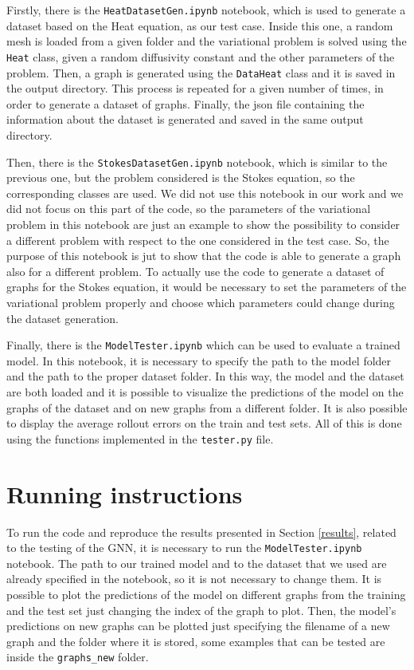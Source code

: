 \documentclass[11pt,a4paper]{article}
\begin{document}
Firstly, there is the \texttt{HeatDatasetGen.ipynb} notebook, which is used to generate a dataset based on the Heat equation, as our test case. Inside this one, a random mesh is loaded from a given folder and the variational problem is solved using the \texttt{Heat} class, given a random diffusivity constant and the other parameters of the problem. Then, a graph is generated using the \texttt{DataHeat} class and it is saved in the output directory. This process is repeated for a given number of times, in order to generate a dataset of graphs. Finally, the json file containing the information about the dataset is generated and saved in the same output directory. 

Then, there is the \texttt{StokesDatasetGen.ipynb} notebook, which is similar to the previous one, but the problem considered is the Stokes equation, so the corresponding classes are used. We did not use this notebook in our work and we did not focus on this part of the code, so the parameters of the variational problem in this notebook are just an example to show the possibility to consider a different problem with respect to the one considered in the test case. So, the purpose of this notebook is jut to show that the code is able to generate a graph also for a different problem. To actually use the code to generate a dataset of graphs for the Stokes equation, it would be necessary to set the parameters of the variational problem properly and choose which parameters could change during the dataset generation.

Finally, there is the \texttt{ModelTester.ipynb} which can be used to evaluate a trained model. In this notebook, it is necessary to specify the path to the model folder and the path to the proper dataset folder. In this way, the model and the dataset are both loaded and it is possible to visualize the predictions of the model on the graphs of the dataset and on new graphs from a different folder. It is also possible to display the average rollout errors on the train and test sets. All of this is done using the functions implemented in the \texttt{tester.py} file.

\section{Running instructions}

To run the code and reproduce the results presented in Section \ref{results}, related to the testing of the GNN, it is necessary to run the \texttt{ModelTester.ipynb} notebook. The path to our trained model and to the dataset that we used are already specified in the notebook, so it is not necessary to change them. It is possible to plot the predictions of the model on different graphs from the training and the test set just changing the index of the graph to plot. Then, the model's predictions on new graphs can be plotted just specifying the filename of a new graph and the folder where it is stored, some examples that can be tested are inside the \texttt{graphs\_new} folder.
\end{document}
